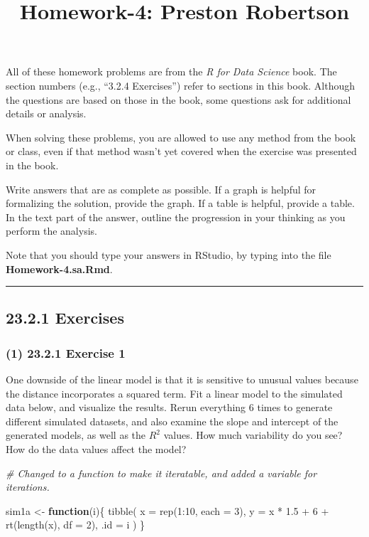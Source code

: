\documentclass[
]{article}
\title{Homework-4: Preston Robertson}
\author{}
\date{\vspace{-2.5em}}
\newenvironment{Shaded}{\begin{snugshade}}{\end{snugshade}}
\newcommand{\AttributeTok}[1]{\textcolor[rgb]{0.77,0.63,0.00}{#1}}
\newcommand{\CommentTok}[1]{\textcolor[rgb]{0.56,0.35,0.01}{\textit{#1}}}
\newcommand{\ControlFlowTok}[1]{\textcolor[rgb]{0.13,0.29,0.53}{\textbf{#1}}}
\newcommand{\DecValTok}[1]{\textcolor[rgb]{0.00,0.00,0.81}{#1}}
\newcommand{\FloatTok}[1]{\textcolor[rgb]{0.00,0.00,0.81}{#1}}
\newcommand{\FunctionTok}[1]{\textcolor[rgb]{0.00,0.00,0.00}{#1}}
\newcommand{\NormalTok}[1]{#1}
\newcommand{\OtherTok}[1]{\textcolor[rgb]{0.56,0.35,0.01}{#1}}
\newcommand{\SpecialCharTok}[1]{\textcolor[rgb]{0.00,0.00,0.00}{#1}}
\begin{document}
\maketitle

All of these homework problems are from the \emph{R for Data Science}
book. The section numbers (e.g., ``3.2.4 Exercises'') refer to sections
in this book. Although the questions are based on those in the book,
some questions ask for additional details or analysis.

When solving these problems, you are allowed to use any method from the
book or class, even if that method wasn't yet covered when the exercise
was presented in the book.

Write answers that are as complete as possible. If a graph is helpful
for formalizing the solution, provide the graph. If a table is helpful,
provide a table. In the text part of the answer, outline the progression
in your thinking as you perform the analysis.

Note that you should type your answers in RStudio, by typing into the
file \textbf{Homework-4.sa.Rmd}.

\begin{center}\rule{0.5\linewidth}{0.5pt}\end{center}

\hypertarget{exercises}{%
\subsection{23.2.1 Exercises}\label{exercises}}

\hypertarget{exercise-1}{%
\subsubsection{(1) 23.2.1 Exercise 1}\label{exercise-1}}

One downside of the linear model is that it is sensitive to unusual
values because the distance incorporates a squared term. Fit a linear
model to the simulated data below, and visualize the results. Rerun
everything 6 times to generate different simulated datasets, and also
examine the slope and intercept of the generated models, as well as the
\(R^2\) values. How much variability do you see? How do the data values
affect the model?

\begin{Shaded}
\begin{Highlighting}[]
\CommentTok{\# Changed to a function to make it iteratable, and added a variable for iterations.}

\NormalTok{sim1a }\OtherTok{\textless{}{-}} \ControlFlowTok{function}\NormalTok{(i)\{}
  \FunctionTok{tibble}\NormalTok{(}
    \AttributeTok{x =} \FunctionTok{rep}\NormalTok{(}\DecValTok{1}\SpecialCharTok{:}\DecValTok{10}\NormalTok{, }\AttributeTok{each =} \DecValTok{3}\NormalTok{),}
    \AttributeTok{y =}\NormalTok{ x }\SpecialCharTok{*} \FloatTok{1.5} \SpecialCharTok{+} \DecValTok{6} \SpecialCharTok{+} \FunctionTok{rt}\NormalTok{(}\FunctionTok{length}\NormalTok{(x), }\AttributeTok{df =} \DecValTok{2}\NormalTok{),}
    \AttributeTok{.id =}\NormalTok{ i}
\NormalTok{  )}
\NormalTok{\}}
\end{Highlighting}
\end{Shaded}
\end{document}
